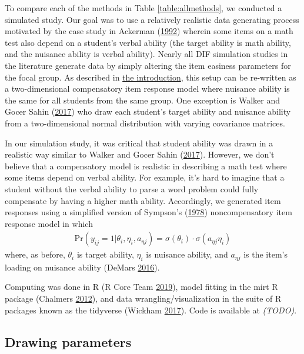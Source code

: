 \documentclass[
  11pt,
]{article}
\begin{document}
To compare each of the methods in Table \ref{table:allmethods}, we conducted a simulated study. Our goal was to use a relatively realistic data generating process motivated by the case study in Ackerman (\protect\hyperlink{ref-ackerman1992didactic}{1992}) wherein some items on a math test also depend on a student's verbal ability (the target ability is math ability, and the nuisance ability is verbal ability). Nearly all DIF simulation studies in the literature generate data by simply altering the item easiness parameters for the focal group. As described in \protect\hyperlink{intro}{the introduction}, this setup can be re-written as a two-dimensional compensatory item response model where nuisance ability is the same for all students from the same group. One exception is Walker and Gocer Sahin (\protect\hyperlink{ref-walker2017using}{2017}) who draw each student's target ability and nuisance ability from a two-dimensional normal distribution with varying covariance matrices.

In our simulation study, it was critical that student ability was drawn in a realistic way similar to Walker and Gocer Sahin (\protect\hyperlink{ref-walker2017using}{2017}). However, we don't believe that a compensatory model is realistic in describing a math test where some items depend on verbal ability. For example, it's hard to imagine that a student without the verbal ability to parse a word problem could fully compensate by having a higher math ability. Accordingly, we generated item responses using a simplified version of Sympson's (\protect\hyperlink{ref-sympson1978model}{1978}) noncompensatory item response model in which
\begin{align}
\text{Pr}(y_{ij} = 1 | \theta_i, \eta_i, a_{\eta j}) = \sigma(\theta_i) \cdot \sigma(a_{\eta j}\eta_i)
\end{align}
where, as before, \(\theta_i\) is target ability, \(\eta_i\) is nuisance ability, and \(a_{\eta j}\) is the item's loading on nuisance ability (DeMars \protect\hyperlink{ref-demars2016partially}{2016}).

Computing was done in R (R Core Team \protect\hyperlink{ref-rcore}{2019}), model fitting in the mirt R package (Chalmers \protect\hyperlink{ref-chalmers2012mirt}{2012}), and data wrangling/visualization in the suite of R packages known as the tidyverse (Wickham \protect\hyperlink{ref-tidy}{2017}). Code is available at \emph{(TODO)}.

\hypertarget{drawing-parameters}{%
\subsection{Drawing parameters}\label{drawing-parameters}}
\end{document}
